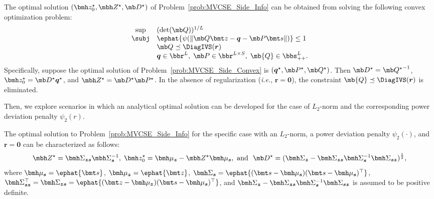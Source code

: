 \documentclass[mnsc, nonblindrev]{informswp}
\newcommand{\1}[1]{\mathds{1}{\left(#1\right)}}
\begin{document}
\begin{theorem}\label{thm:sideinfo}
The optimal solution $(\bmh z_0^\star, \mbh Z^\star, \mb D^\star)$ of Problem~\eqref{prob:MVCSE_Side_Info} can be obtained from solving the following convex optimization problem:
\begin{equation}\label{prob:MVCSE_Side_Convex}
\begin{array}{cll}
\sup & (\det(\mb Q))^{1/L} \\
\subj & \ephat{\psi(\| \mb Q \bmt z - \bm q - \mb P \bmt s \|)} \leq 1 \\
& \mb Q \preceq \DiagIVS(\bm r) \\
& \bm q \in \bbr^L, \; \mb P \in \bbr^{L \times S}, \; \mb{Q} \in \bbs^{L}_{++}. 
\end{array} 
\end{equation}
Specifically, suppose the optimal solution of Problem~\eqref{prob:MVCSE_Side_Convex} is $(\bm q^\star, \mb P^\star, \mb Q^\star)$. Then $\mb D^\star = {\mb Q^\star}^{-1}$, $\bmh z_0^\star = \mb D^\star \bm q^\star$, and $\mbh Z^\star = \mb D^\star \mb P^\star$. In the absence of regularization (\textit{i.e.}, $\bm r =\bm 0$), the constraint $\mb{Q} \preceq \DiagIVS(\bm r)$ is eliminated.  
\end{theorem}

Then, we explore scenarios in which an analytical optimal solution can be developed for the case of $L_2$-norm and the corresponding power deviation penalty $\psi_2(r)$. 
\begin{theorem}
\label{chap8:thm:MVCSESideInformationL2}
The optimal solution to Problem~\eqref{prob:MVCSE_Side_Info} for the specific case with an $L_2$-norm, a power deviation penalty $\psi_2(\cdot)$, and $\bm r = \bm 0$ can be characterized as follows:
$$
\mbh Z^\star = \bmh \Sigma_{\bm z \bm s} \mbh \Sigma_{\bm s}^{-1}, \; \bmh z_0^\star = \bmh \mu_{\bm z} - \mbh Z^\star \bmh \mu_{\bm s}, ~\text{and}~~ \mb D^\star = (\bmh \Sigma_{\bm z} - \bmh \Sigma_{\bm z \bm s} \bmh \Sigma_{\bm s}^{-1} \bmh \Sigma_{\bm s \bm z})^{\frac{1}{2}},
$$
where ${\bmh \mu_{\bm s}} = \ephat{\bmt s}$, $\bmh \mu_{\bm z}= \ephat{\bmt z}$,  
$\bmh \Sigma_{\bm s} = \ephat{ (\bmt s - \bmh \mu_{\bm s} ) (\bmt s - \bmh \mu_{\bm s})^\top}$, $\bmh \Sigma_{\bm s\bm z}^\top = \bmh \Sigma_{\bm z\bm s} = \ephat{ (\bmt z - \bmh \mu_{\bm z}) (\bmt s - \bmh \mu_{\bm s})^\top}$, and $\bmh \Sigma_{\bm z} - \bmh \Sigma_{\bm z \bm s} \bmh \Sigma_{\bm s}^{-1} \bmh \Sigma_{\bm s \bm z}$ is assumed to be positive definite.
\end{theorem}
\end{document}
